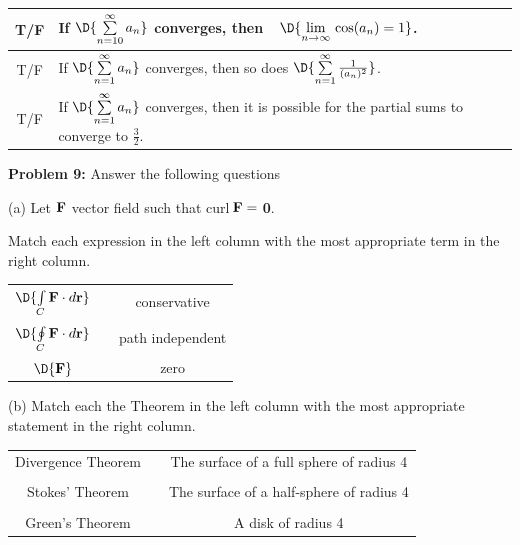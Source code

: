 \documentclass[12pt]{amsart}
\numberwithin{equation}{section}
\begin{document}
\begin{tabular}{| c | p{17.2cm} |}
		\hline
		T\quad/\quad F & If $\D{\sum \limits_{n=10}^{\infty} a_n}$ converges, then \,\, $\D{\lim \limits_{n \to \infty}\, \cos(a_n) = 1}$.\\
		\hline
		T\quad/\quad F & If $\D{\sum \limits_{n=1}^{\infty} a_n}$ converges, then so does $\D{\sum \limits_{n=1}^{\infty} \frac{1}{(a_n)^2}}$.\\
		\hline
		T\quad/\quad F & If $\D{\sum \limits_{n=1}^{\infty} a_n}$ converges, then it is possible for the partial sums to converge to $\frac{3}{2}$.\\
		\hline
	\end{tabular}

\thispagestyle{empty}
\newpage
\thispagestyle{empty}

{\bf Problem 9:} Answer the following questions

\vspace{0.2cm}


(a) Let $\text{\bf F}$ vector field such that curl\,$\text{\bf F} =$ {\bf 0}.  

Match each expression in the left column with the most appropriate term in the right column.

\vspace{0.2cm}

\begin{center}
\setlength{\extrarowheight}{0.1cm}
\begin{tabular}{cp{4cm}c}
	$\D{\int \limits_{C} \text{\bf F}\cdot d\text{\bf r}}$ & & conservative\\
	$\D{\oint \limits_{C} \text{\bf F}\cdot d\text{\bf r}}$ & & path independent\\
	$\D{\text{\bf F}}$ & & zero\\
\end{tabular}
\end{center}

\vspace{0.4cm}

(b) Match each the Theorem in the left column with the most appropriate statement in the right column.

\vspace{0.2cm}

\begin{center}
\begin{tabular}{cp{5cm}c}
	Divergence Theorem & & The surface of a full sphere of radius 4\\
	&&\\
	Stokes' Theorem & & The surface of a half-sphere of radius 4\\
	&&\\
	Green's Theorem & & A disk of radius 4\\
\end{tabular}
\end{center}
\end{document}
